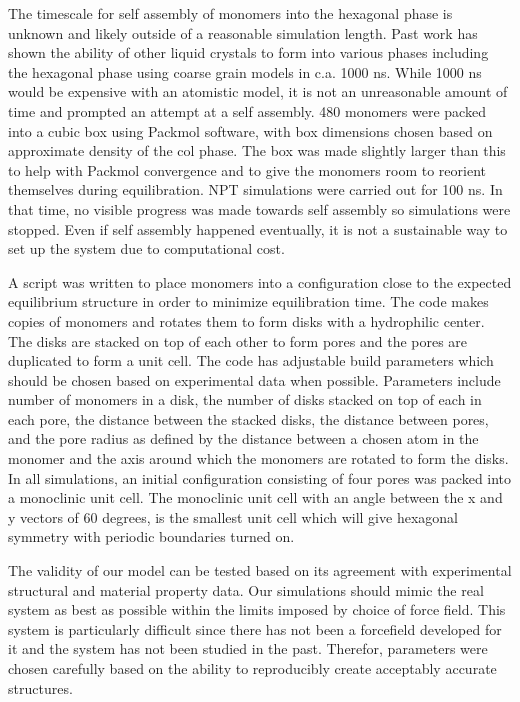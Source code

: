\documentclass{article}
\begin{document}
	The timescale for self assembly of monomers into the hexagonal phase is unknown and likely outside of a reasonable simulation length. Past work has shown the ability of other liquid crystals to form into various phases including the hexagonal phase using coarse grain models in c.a. 1000 ns. While 1000 ns would be expensive with an atomistic model, it is not an unreasonable amount of time and prompted an attempt at a self assembly. 480 monomers were packed into a cubic box using Packmol software, with box dimensions chosen based on approximate density of the col phase. The box was made slightly larger than this to help with Packmol convergence and to give the monomers room to reorient themselves during equilibration. NPT simulations were carried out for 100 ns. In that time, no visible progress was made towards self assembly so simulations were stopped. Even if self assembly happened eventually, it is not a sustainable way to set up the system due to computational cost.

	A script was written to place monomers into a configuration close to the expected equilibrium structure in order to minimize equilibration time. The code makes copies of monomers and rotates them to form disks with a hydrophilic center. The disks are stacked on top of each other to form pores and the pores are duplicated to form a unit cell. The code has adjustable build parameters which should be chosen based on experimental data when possible. Parameters include number of monomers in a disk, the number of disks stacked on top of each in each pore, the distance between the stacked disks, the distance between pores, and the pore radius as defined by the distance between a chosen atom in the monomer and the axis around which the monomers are rotated to form the disks. In all simulations, an initial configuration consisting of four pores was packed into a monoclinic unit cell. The monoclinic unit cell with an angle between the x and y vectors of 60 degrees, is the smallest unit cell which will give hexagonal symmetry with periodic boundaries turned on. 

        The validity of our model can be tested based on its agreement with experimental structural and material property data. Our simulations should mimic the real system as best as possible within the limits imposed by choice of force field. This system is particularly difficult since there has not been a forcefield developed for it and the system has not been studied in the past. Therefor, parameters were chosen carefully based on the ability to reproducibly create acceptably accurate structures. 
\end{document}
